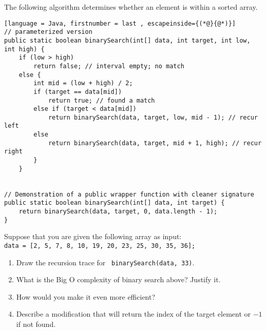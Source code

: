 \item The following algorithm determines whether an element is within a sorted array.
\begin{lstlisting}[language = Java, firstnumber = last , escapeinside={(*@}{@*)}]
// parameterized version
public static boolean binarySearch(int[] data, int target, int low, int high) {
    if (low > high)
        return false; // interval empty; no match
    else {
        int mid = (low + high) / 2;
        if (target == data[mid])
            return true; // found a match
        else if (target < data[mid])
            return binarySearch(data, target, low, mid - 1); // recur left
        else
            return binarySearch(data, target, mid + 1, high); // recur right
        }
    }


// Demonstration of a public wrapper function with cleaner signature
public static boolean binarySearch(int[] data, int target) {
    return binarySearch(data, target, 0, data.length - 1);
}
\end{lstlisting}
Suppose that you are given the following array as input: \\\lstinline{data = [2, 5, 7, 8, 10, 19, 20, 23, 25, 30, 35, 36];}
\begin{enumerate}
    \item Draw the recursion trace for \ \lstinline{binarySearch(data, 33)}.
    \item What is the Big O complexity of binary search above? Justify it.
    \item How would you make it even more efficient?
    \item Describe a modification that will return the index of the target element or $-1$ if not found.
\end{enumerate}
\begin{center}
\end{center}

